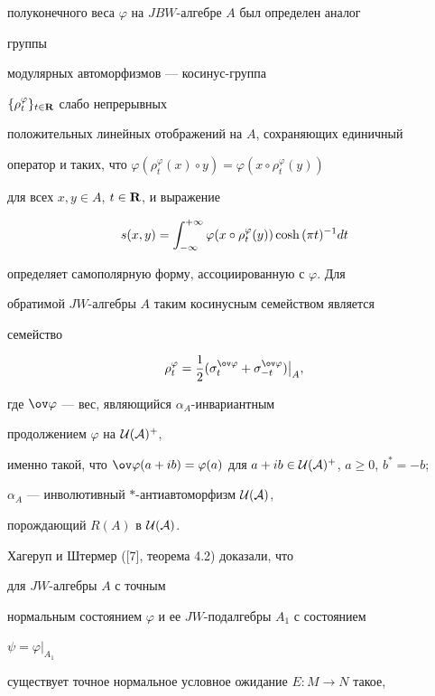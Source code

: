 полуконечного веса $\varphi$ на $JBW$-алгебре $A$ был определен аналог 


группы 


модулярных автоморфизмов --- косинус-группа 


$\{\rho^\varphi_t\}_{t\in\bold R}$ слабо непрерывных 


положительных линейных отображений на $A$, сохраняющих единичный 


оператор и таких, что $\varphi(\rho^\varphi_t(x)\circ y)=\varphi(x\circ 


\rho^\varphi_t(y))$ 


для всех $x,y\in A$, $t\in\bold R$, и выражение 


$$ 


s(x,y)=\int^{+\infty}_{-\infty} 


\varphi(x\circ \rho^\varphi_t(y))\text{\,cosh\,}(\pi t)^{-1}dt 


$$ 


определяет самополярную форму, ассоциированную с $\varphi$. Для 


обратимой $JW$-алгебры $A$ таким косинусным семейством является 


семейство 


$$ 


\rho^\varphi_t=\frac{1}{2}(\sigma^{\ov\varphi}_t+ 


\sigma^{\ov\varphi}_{-t})\big|_A, 


$$ 


где $\ov\varphi$ --- вес, являющийся $\alpha_A$-инвариантным 


продолжением $\varphi$ на $\cal U(A)^+$, 


именно такой, что $\ov\varphi(a+i{}b)=\varphi(a)$ для $a+i{}b\in\cal 


U(A)^+$, $a\ge0$, $b^*=-b$; 


$\alpha_A$ --- инволютивный $*$-антиавтоморфизм $\cal U(A)$, 


порождающий $R(A)$ в $\cal U(A)$. 


 


Хагеруп и Штермер ([7], теорема 4.2) доказали, что 


для $JW$-алгебры $A$ с точным 


нормальным состоянием $\varphi$ и ее $JW$-подалгебры $A_1$ с состоянием 


$\psi=\varphi|_{A_1}$ 


существует точное нормальное условное ожидание $E:M\to N$ такое, 



